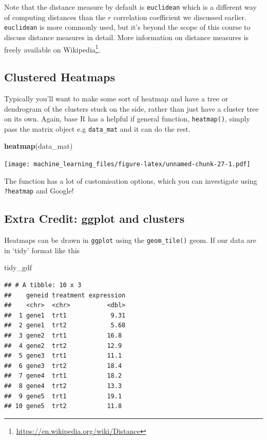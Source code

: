 \documentclass[
]{book}
\newenvironment{Shaded}{\begin{snugshade}}{\end{snugshade}}
\newcommand{\KeywordTok}[1]{\textcolor[rgb]{0.13,0.29,0.53}{\textbf{#1}}}
\newcommand{\NormalTok}[1]{#1}
\renewcommand{\href}[2]{#2\footnote{\url{#1}}}
\begin{document}
Note that the distance measure by default is \texttt{euclidean} which is a different way of computing distances than the \(r\) correlation coefficient we discussed earlier. \texttt{euclidean} is more commonly used, but it's beyond the scope of this course to discuss distance measures in detail. More information on distance measures is freely available on \href{https://en.wikipedia.org/wiki/Distance}{Wikipedia}.

\hypertarget{clustered-heatmaps}{%
\subsection{Clustered Heatmaps}\label{clustered-heatmaps}}

Typically you'll want to make some sort of heatmap and have a tree or dendrogram of the clusters stuck on the side, rather than just have a cluster tree on its own. Again, base R has a helpful if general function, \texttt{heatmap()}, simply pass the matrix object e.g \texttt{data\_mat} and it can do the rest.

\begin{Shaded}
\begin{Highlighting}[]
\KeywordTok{heatmap}\NormalTok{(data_mat)}
\end{Highlighting}
\end{Shaded}

\texttt{[image: machine\_learning\_files/figure-latex/unnamed-chunk-27-1.pdf]}

The function has a lot of customisation options, which you can investigate using \texttt{?heatmap} and Google!

\hypertarget{extra-credit-ggplot-and-clusters}{%
\subsection{Extra Credit: ggplot and clusters}\label{extra-credit-ggplot-and-clusters}}

Heatmaps can be drawn in \texttt{ggplot} using the \texttt{geom\_tile()} geom. If our data are in `tidy' format like this

\begin{Shaded}
\begin{Highlighting}[]
\NormalTok{tidy_gdf}
\end{Highlighting}
\end{Shaded}

\begin{verbatim}
## # A tibble: 10 x 3
##    geneid treatment expression
##    <chr>  <chr>          <dbl>
##  1 gene1  trt1            9.31
##  2 gene1  trt2            5.68
##  3 gene2  trt1           16.8 
##  4 gene2  trt2           12.9 
##  5 gene3  trt1           11.1 
##  6 gene3  trt2           18.4 
##  7 gene4  trt1           18.2 
##  8 gene4  trt2           13.3 
##  9 gene5  trt1           19.1 
## 10 gene5  trt2           11.8
\end{verbatim}
\end{document}

